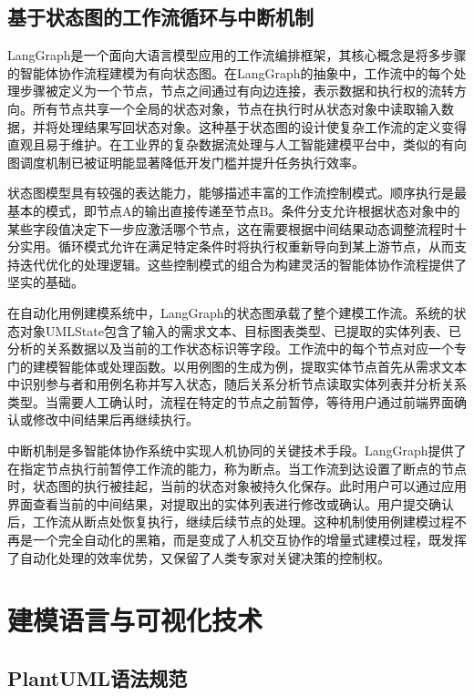 \subsection{基于状态图的工作流循环与中断机制}

LangGraph是一个面向大语言模型应用的工作流编排框架，其核心概念是将多步骤的智能体协作流程建模为有向状态图。在LangGraph的抽象中，工作流中的每个处理步骤被定义为一个节点，节点之间通过有向边连接，表示数据和执行权的流转方向。所有节点共享一个全局的状态对象，节点在执行时从状态对象中读取输入数据，并将处理结果写回状态对象。这种基于状态图的设计使复杂工作流的定义变得直观且易于维护。在工业界的复杂数据流处理与人工智能建模平台中，类似的有向图调度机制已被证明能显著降低开发门槛并提升任务执行效率\cite{xu2025cloudnative}。

状态图模型具有较强的表达能力，能够描述丰富的工作流控制模式。顺序执行是最基本的模式，即节点A的输出直接传递至节点B。条件分支允许根据状态对象中的某些字段值决定下一步应激活哪个节点，这在需要根据中间结果动态调整流程时十分实用。循环模式允许在满足特定条件时将执行权重新导向到某上游节点，从而支持迭代优化的处理逻辑。这些控制模式的组合为构建灵活的智能体协作流程提供了坚实的基础。

在自动化用例建模系统中，LangGraph的状态图承载了整个建模工作流。系统的状态对象UMLState包含了输入的需求文本、目标图表类型、已提取的实体列表、已分析的关系数据以及当前的工作状态标识等字段。工作流中的每个节点对应一个专门的建模智能体或处理函数。以用例图的生成为例，提取实体节点首先从需求文本中识别参与者和用例名称并写入状态，随后关系分析节点读取实体列表并分析关系类型。当需要人工确认时，流程在特定的节点之前暂停，等待用户通过前端界面确认或修改中间结果后再继续执行。

中断机制是多智能体协作系统中实现人机协同的关键技术手段。LangGraph提供了在指定节点执行前暂停工作流的能力，称为断点。当工作流到达设置了断点的节点时，状态图的执行被挂起，当前的状态对象被持久化保存。此时用户可以通过应用界面查看当前的中间结果，对提取出的实体列表进行修改或确认。用户提交确认后，工作流从断点处恢复执行，继续后续节点的处理。这种机制使用例建模过程不再是一个完全自动化的黑箱，而是变成了人机交互协作的增量式建模过程，既发挥了自动化处理的效率优势，又保留了人类专家对关键决策的控制权。

\section{建模语言与可视化技术}

\subsection{PlantUML语法规范}

